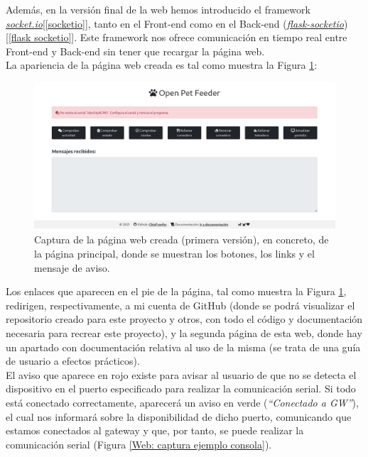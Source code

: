 \documentclass[12pt]{article}
\begin{document}
	\noindent Además, en la versión final de la web hemos introducido el framework \href{https://socket.io/}{\textit{socket.io}}[\ref{socketio}], tanto en el Front-end como en el Back-end (\href{https://flask-socketio.readthedocs.io/en/latest/}{\textit{flask-socketio}})[\ref{flask socketio}]. Este framework nos ofrece comunicación en tiempo real entre Front-end y Back-end sin tener que recargar la página web.\\ 
	
	\noindent La apariencia de la página web creada es tal como muestra la Figura \ref{Web: captura pagina principal}: \\
	
	\pagebreak
	
	\begin{figure}[h!]
		\begin{center}
			\includegraphics[width=1\textwidth]{img/captura_web_1.png}
			\caption{Captura de la página web creada (primera versión), en concreto, de la página principal, donde se muestran los botones, los links y el mensaje de aviso.}
			\label{Web: captura pagina principal}
		\end{center}
	\end{figure}
	
	\noindent Los enlaces que aparecen en el pie de la página, tal como muestra la Figura \ref{Web: captura pagina principal}, redirigen, respectivamente, a mi cuenta de GitHub (donde se podrá visualizar el repositorio creado para este proyecto y otros, con todo el código y documentación necesaria para recrear este proyecto), y la segunda página de esta web, donde hay un apartado con documentación relativa al uso de la misma (se trata de una guía de usuario a efectos prácticos). \\
	
	\noindent El aviso que aparece en rojo existe para avisar al usuario de que no se detecta el dispositivo en el puerto especificado para realizar la comunicación serial. Si todo está conectado correctamente, aparecerá un aviso en verde (\textit{``Conectado a GW''}), el cual nos informará sobre la disponibilidad de dicho puerto, comunicando que estamos conectados al gateway y que, por tanto, se puede realizar la comunicación serial (Figura \ref{Web: captura ejemplo consola}). \\
	
\end{document}
